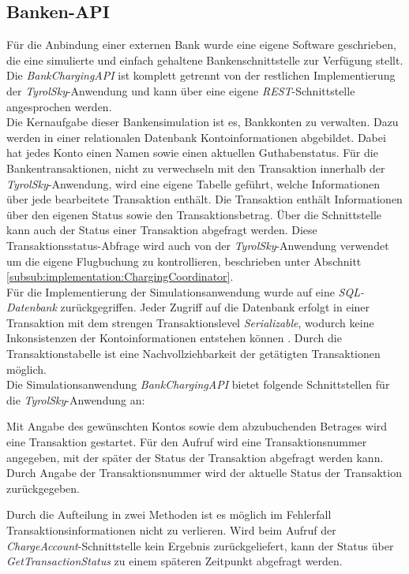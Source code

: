 \subsection{Banken-API}
\label{subsec:implementation:bankApi}
Für die Anbindung einer externen Bank wurde eine eigene Software geschrieben, die eine simulierte und einfach gehaltene Bankenschnittstelle zur Verfügung stellt. Die \textit{BankChargingAPI} ist komplett getrennt von der restlichen Implementierung der \textit{TyrolSky}-Anwendung und kann über eine eigene \textit{REST}-Schnittstelle angesprochen werden. \\
Die Kernaufgabe dieser Bankensimulation ist es, Bankkonten zu verwalten. Dazu werden in einer relationalen Datenbank Kontoinformationen abgebildet. Dabei hat jedes Konto einen Namen sowie einen aktuellen Guthabenstatus. Für die Bankentransaktionen, nicht zu verwechseln mit den Transaktion innerhalb der \textit{TyrolSky}-Anwendung, wird eine eigene Tabelle geführt, welche Informationen über jede bearbeitete Transaktion enthält. Die Transaktion enthält Informationen über den eigenen Status sowie den Transaktionsbetrag. Über die Schnittstelle kann auch der Status einer Transaktion abgefragt werden. Diese Transaktionsstatus-Abfrage wird auch von der \textit{TyrolSky}-Anwendung verwendet um die eigene Flugbuchung zu kontrollieren, beschrieben unter Abschnitt \ref{subsub:implementation:ChargingCoordinator}. \\
Für die Implementierung der Simulationsanwendung wurde auf eine \textit{SQL-Datenbank} zurückgegriffen. Jeder Zugriff auf die Datenbank erfolgt in einer Transaktion mit dem strengen Transaktionslevel \textit{Serializable}, wodurch keine Inkonsistenzen der Kontoinformationen entstehen können \citep{adya2000generalized}. Durch die Transaktionstabelle ist eine Nachvollziehbarkeit der getätigten Transaktionen möglich. \\
Die Simulationsanwendung \textit{BankChargingAPI} bietet folgende Schnittstellen für die \textit{TyrolSky}-Anwendung an:
\begin{itemize}
    Mit Angabe des gewünschten Kontos sowie dem abzubuchenden Betrages wird eine Transaktion gestartet. Für den Aufruf wird eine Transaktionsnummer angegeben, mit der später der Status der Transaktion abgefragt werden kann.
    Durch Angabe der Transaktionsnummer wird der aktuelle Status der Transaktion zurückgegeben. 
\end{itemize}
Durch die Aufteilung in zwei Methoden ist es möglich im Fehlerfall Transaktionsinformationen nicht zu verlieren. Wird beim Aufruf der \textit{ChargeAccount}-Schnittstelle kein Ergebnis zurückgeliefert, kann der Status über \textit{GetTransactionStatus} zu einem späteren Zeitpunkt abgefragt werden.

